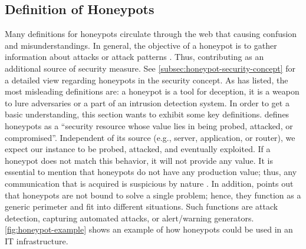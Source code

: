 \subsection{Definition of Honeypots}

Many definitions for honeypots circulate through the web that causing confusion and misunderstandings.
In general, the objective of a honeypot is to gather information about attacks or attack patterns \cite{NawrockiWSKS2016}.
Thus, contributing as an additional source of security measure.
See \autoref{subsec:honeypot-security-concept} for a detailed view regarding honeypots in the security concept.
As \citet{Spitzner2003} has listed, the most misleading definitions are: a honeypot is a tool for deception, it is a weapon to lure adversaries or a part of an intrusion detection system.
In order to get a basic understanding, this section wants to exhibit some key definitions.
\citet{Spitzner2003} defines honeypots as a \enquote{security resource whose value lies in being probed, attacked, or compromised}.
Independent of its source (e.g., server, application, or router), we expect our instance to be probed, attacked, and eventually exploited.
If a honeypot does not match this behavior, it will not provide any value.
It is essential to mention that honeypots do not have any production value; thus, any communication that is acquired is suspicious by nature \cite{Spitzner2003}.
In addition, \citet{Spitzner2003} points out that honeypots are not bound to solve a single problem; hence, they function as a generic perimeter and fit into different situations.
Such functions are attack detection, capturing automated attacks, or alert/warning generators.
\autoref{fig:honeypot-example} shows an example of how honeypots could be used in an IT infrastructure.

